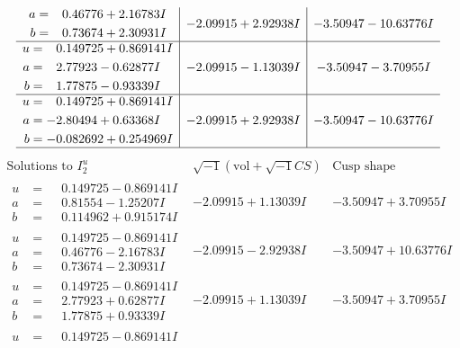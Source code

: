 \documentclass[1p]{elsarticle_modified}
\theoremstyle{definition}
\newcommand{\I}{\sqrt{-1}}
\begin{document}
$$\begin{array}{c|c|c}
\begin{aligned}
a &= \phantom{-}0.46776 + 2.16783 I \\
b &= \phantom{-}0.73674 + 2.30931 I\end{aligned}
 & -2.09915 + 2.92938 I & -3.50947 - 10.63776 I \\ \hline\begin{aligned}
u &= \phantom{-}0.149725 + 0.869141 I \\
a &= \phantom{-}2.77923 - 0.62877 I \\
b &= \phantom{-}1.77875 - 0.93339 I\end{aligned}
 & -2.09915 - 1.13039 I & -3.50947 - 3.70955 I \\ \hline\begin{aligned}
u &= \phantom{-}0.149725 + 0.869141 I \\
a &= -2.80494 + 0.63368 I \\
b &= -0.082692 + 0.254969 I\end{aligned}
 & -2.09915 + 2.92938 I & -3.50947 - 10.63776 I\\
 \hline 
 \end{array}$$\newpage$$\begin{array}{c|c|c}  
\text{Solutions to }I^u_{2}& \I (\text{vol} + \sqrt{-1}CS) & \text{Cusp shape}\\
 \hline 
\begin{aligned}
u &= \phantom{-}0.149725 - 0.869141 I \\
a &= \phantom{-}0.81554 - 1.25207 I \\
b &= \phantom{-}0.114962 + 0.915174 I\end{aligned}
 & -2.09915 + 1.13039 I & -3.50947 + 3.70955 I \\ \hline\begin{aligned}
u &= \phantom{-}0.149725 - 0.869141 I \\
a &= \phantom{-}0.46776 - 2.16783 I \\
b &= \phantom{-}0.73674 - 2.30931 I\end{aligned}
 & -2.09915 - 2.92938 I & -3.50947 + 10.63776 I \\ \hline\begin{aligned}
u &= \phantom{-}0.149725 - 0.869141 I \\
a &= \phantom{-}2.77923 + 0.62877 I \\
b &= \phantom{-}1.77875 + 0.93339 I\end{aligned}
 & -2.09915 + 1.13039 I & -3.50947 + 3.70955 I \\ \hline\begin{aligned}
u &= \phantom{-}0.149725 - 0.869141 I \\

\end{aligned}
\end{array}$$
\end{document}
